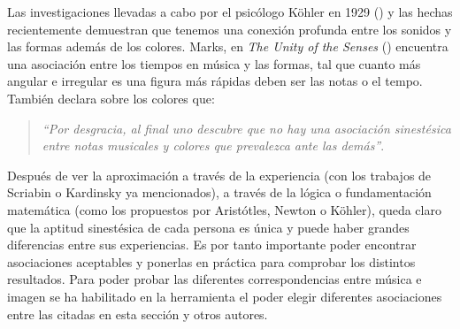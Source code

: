 Las investigaciones llevadas a cabo por el psicólogo Köhler en 1929 (\cite{GestaltPsychology}) y las hechas recientemente demuestran que tenemos una conexión profunda entre los sonidos y las formas además de los colores. Marks, en \emph{The Unity of the Senses} (\cite{TheUnityOfTheSenses}) encuentra una asociación entre los tiempos en música y las formas, tal que cuanto más angular e irregular es una figura \color{blue} más rápidas deben ser las notas o el tempo. \color{black} También declara sobre los colores que:
\begin{quote}
\emph{``Por desgracia, al final uno descubre que no hay una asociación sinestésica entre notas musicales y colores que prevalezca ante las demás''}.\\
\end{quote}

\color{blue} 
Después de ver la aproximación a través de la experiencia (con los trabajos de Scriabin o Kardinsky ya mencionados), a través de la lógica o fundamentación matemática (como los propuestos por Aristótles, Newton o Köhler), queda claro que la aptitud sinestésica de cada persona es única y puede haber grandes diferencias entre sus experiencias. Es por tanto importante poder encontrar asociaciones aceptables y ponerlas en práctica para comprobar los distintos resultados. Para poder probar las diferentes correspondencias entre música e imagen se ha habilitado en la herramienta el poder elegir diferentes asociaciones entre las citadas en esta sección y otros autores. \color{black}